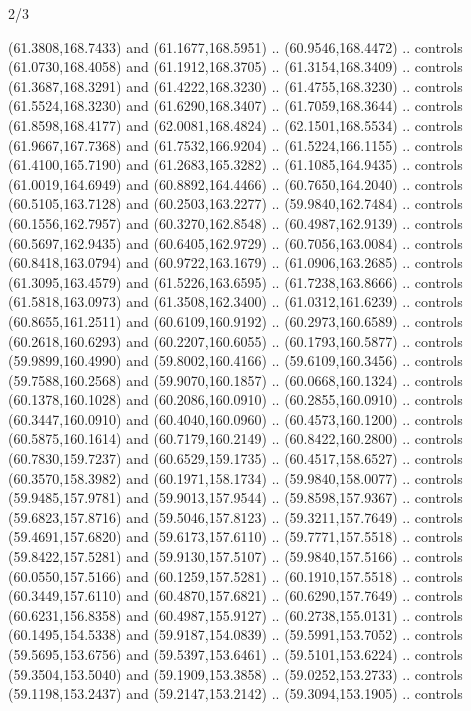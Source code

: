 \begin{flagdescription}{2/3}
\begin{scope}[shift={(0.5\flaglength,0.5)},scale=\flagwidth/320]
\begin{scope}[y=0.8pt, x=0.8pt, yscale=-1,shift={(-118.3,-146)}]
  (61.3808,168.7433) and (61.1677,168.5951) .. (60.9546,168.4472) .. controls
  (61.0730,168.4058) and (61.1912,168.3705) .. (61.3154,168.3409) .. controls
  (61.3687,168.3291) and (61.4222,168.3230) .. (61.4755,168.3230) .. controls
  (61.5524,168.3230) and (61.6290,168.3407) .. (61.7059,168.3644) .. controls
  (61.8598,168.4177) and (62.0081,168.4824) .. (62.1501,168.5534) .. controls
  (61.9667,167.7368) and (61.7532,166.9204) .. (61.5224,166.1155) .. controls
  (61.4100,165.7190) and (61.2683,165.3282) .. (61.1085,164.9435) .. controls
  (61.0019,164.6949) and (60.8892,164.4466) .. (60.7650,164.2040) .. controls
  (60.5105,163.7128) and (60.2503,163.2277) .. (59.9840,162.7484) .. controls
  (60.1556,162.7957) and (60.3270,162.8548) .. (60.4987,162.9139) .. controls
  (60.5697,162.9435) and (60.6405,162.9729) .. (60.7056,163.0084) .. controls
  (60.8418,163.0794) and (60.9722,163.1679) .. (61.0906,163.2685) .. controls
  (61.3095,163.4579) and (61.5226,163.6595) .. (61.7238,163.8666) .. controls
  (61.5818,163.0973) and (61.3508,162.3400) .. (61.0312,161.6239) .. controls
  (60.8655,161.2511) and (60.6109,160.9192) .. (60.2973,160.6589) .. controls
  (60.2618,160.6293) and (60.2207,160.6055) .. (60.1793,160.5877) .. controls
  (59.9899,160.4990) and (59.8002,160.4166) .. (59.6109,160.3456) .. controls
  (59.7588,160.2568) and (59.9070,160.1857) .. (60.0668,160.1324) .. controls
  (60.1378,160.1028) and (60.2086,160.0910) .. (60.2855,160.0910) .. controls
  (60.3447,160.0910) and (60.4040,160.0960) .. (60.4573,160.1200) .. controls
  (60.5875,160.1614) and (60.7179,160.2149) .. (60.8422,160.2800) .. controls
  (60.7830,159.7237) and (60.6529,159.1735) .. (60.4517,158.6527) .. controls
  (60.3570,158.3982) and (60.1971,158.1734) .. (59.9840,158.0077) .. controls
  (59.9485,157.9781) and (59.9013,157.9544) .. (59.8598,157.9367) .. controls
  (59.6823,157.8716) and (59.5046,157.8123) .. (59.3211,157.7649) .. controls
  (59.4691,157.6820) and (59.6173,157.6110) .. (59.7771,157.5518) .. controls
  (59.8422,157.5281) and (59.9130,157.5107) .. (59.9840,157.5166) .. controls
  (60.0550,157.5166) and (60.1259,157.5281) .. (60.1910,157.5518) .. controls
  (60.3449,157.6110) and (60.4870,157.6821) .. (60.6290,157.7649) .. controls
  (60.6231,156.8358) and (60.4987,155.9127) .. (60.2738,155.0131) .. controls
  (60.1495,154.5338) and (59.9187,154.0839) .. (59.5991,153.7052) .. controls
  (59.5695,153.6756) and (59.5397,153.6461) .. (59.5101,153.6224) .. controls
  (59.3504,153.5040) and (59.1909,153.3858) .. (59.0252,153.2733) .. controls
  (59.1198,153.2437) and (59.2147,153.2142) .. (59.3094,153.1905) .. controls

\end{scope}
\end{scope}
\end{flagdescription}
